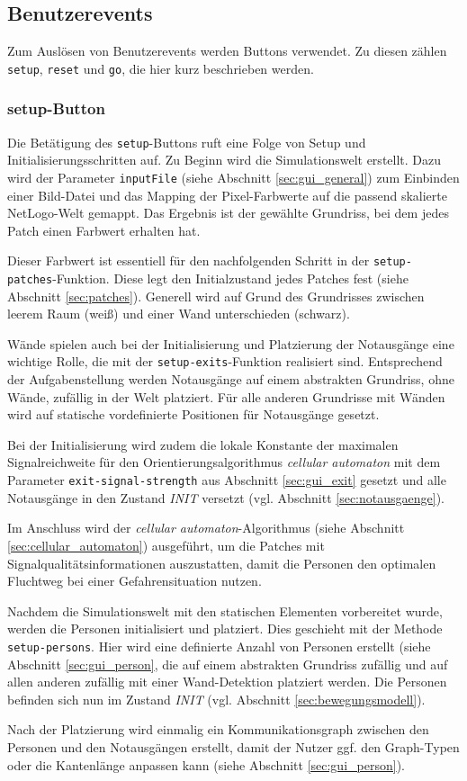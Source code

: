 \subsection{Benutzerevents}
\label{sec:gui_userevents}

Zum Auslösen von Benutzerevents werden Buttons verwendet. Zu diesen zählen \verb|setup|, \verb|reset| und \verb|go|, die hier kurz beschrieben werden.

\subsubsection*{setup-Button}

Die Betätigung des \verb|setup|-Buttons ruft eine Folge von Setup und Initialisierungsschritten auf. Zu Beginn wird die Simulationswelt erstellt. Dazu wird der Parameter \verb|inputFile| (siehe Abschnitt \ref{sec:gui_general}) zum Einbinden einer Bild-Datei und das Mapping der Pixel-Farbwerte auf die passend skalierte NetLogo-Welt gemappt. Das Ergebnis ist der gewählte Grundriss, bei dem jedes Patch einen Farbwert erhalten hat.

Dieser Farbwert ist essentiell für den nachfolgenden Schritt in der \verb|setup-patches|-Funktion. Diese legt den Initialzustand jedes Patches fest (siehe Abschnitt \ref{sec:patches}). Generell wird auf Grund des Grundrisses zwischen leerem Raum (weiß) und einer Wand unterschieden (schwarz). 

Wände spielen auch bei der Initialisierung und Platzierung der Notausgänge eine wichtige Rolle, die mit der \verb|setup-exits|-Funktion realisiert sind. Entsprechend der Aufgabenstellung werden Notausgänge auf einem abstrakten Grundriss, ohne Wände, zufällig in der Welt platziert. Für alle anderen Grundrisse mit Wänden wird auf statische vordefinierte Positionen für Notausgänge gesetzt.\par
Bei der Initialisierung wird zudem die lokale Konstante der maximalen Signalreichweite für den Orientierungsalgorithmus \emph{cellular automaton} mit dem Parameter \verb|exit-signal-strength| aus Abschnitt \ref{sec:gui_exit} gesetzt und alle Notausgänge in den Zustand \emph{INIT} versetzt (vgl. Abschnitt \ref{sec:notausgaenge}).\par
Im Anschluss wird der \emph{cellular automaton}-Algorithmus (siehe Abschnitt \ref{sec:cellular_automaton}) ausgeführt, um die Patches mit Signalqualitätsinformationen auszustatten, damit die Personen den optimalen Fluchtweg bei einer Gefahrensituation nutzen.

Nachdem die Simulationswelt mit den statischen Elementen vorbereitet wurde, werden die Personen initialisiert und platziert. Dies geschieht mit der Methode \verb|setup-persons|. Hier wird eine definierte Anzahl von Personen erstellt (siehe Abschnitt \ref{sec:gui_person}, die auf einem abstrakten Grundriss zufällig und auf allen anderen zufällig mit einer Wand-Detektion platziert werden. Die Personen befinden sich nun im Zustand \emph{INIT} (vgl. Abschnitt \ref{sec:bewegungsmodell}).\par
Nach der Platzierung wird einmalig ein Kommunikationsgraph zwischen den Personen und den Notausgängen erstellt, damit der Nutzer ggf. den Graph-Typen oder die Kantenlänge anpassen kann (siehe Abschnitt \ref{sec:gui_person}).
 
